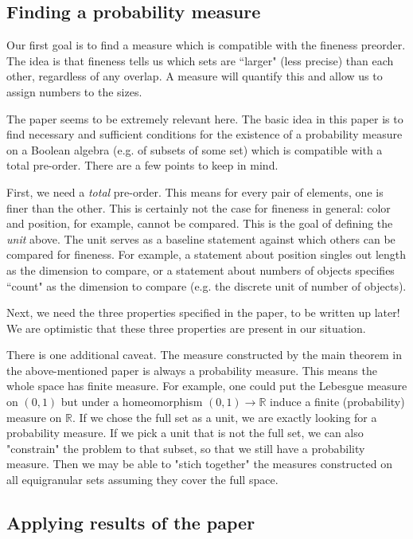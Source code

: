 \documentclass{article}
\begin{document}
\subsection{Finding a probability measure}

Our first goal is to find a measure which is compatible with the fineness preorder. The idea is that fineness tells us which sets are ``larger" (less precise) than each other, regardless of any overlap.  A measure will quantify this and allow us to assign numbers to the sizes.

The paper \cite{probexistence} seems to be extremely relevant here. The basic idea in this paper is to find necessary and sufficient conditions for the existence of a probability measure on a Boolean algebra (e.g. of subsets of some set) which is compatible with a total pre-order. There are a few points to keep in mind. 

First, we need a \emph{total} pre-order. This means for every pair of elements, one is finer than the other. This is certainly not the case for fineness in general: color and position, for example, cannot be compared. This is the goal of defining the \emph{unit} above. The unit serves as a baseline statement against which others can be compared for fineness. For example, a statement about position singles out length as the dimension to compare, or a statement about numbers of objects specifies ``count" as the dimension to compare (e.g. the discrete unit of number of objects). 

Next, we need the three properties specified in the paper, to be written up later! We are optimistic that these three properties are present in our situation. 

There is one additional caveat. The measure constructed by the main theorem in the above-mentioned paper is always a probability measure. This means the whole space has finite measure. For example, one could put the Lebesgue measure on $(0,1)$ but under a homeomorphism $(0,1)\to\mathbb{R}$ induce a finite (probability) measure on  $\mathbb{R}$. If we chose the full set as a unit, we are exactly looking for a probability measure. If we pick a unit that is not the full set, we can also "constrain" the problem to that subset, so that we still have a probability measure. Then we may be able to "stich together" the measures constructed on all equigranular sets assuming they cover the full space. 

\subsection{Applying results of the paper \cite{villegas}}
\end{document}
